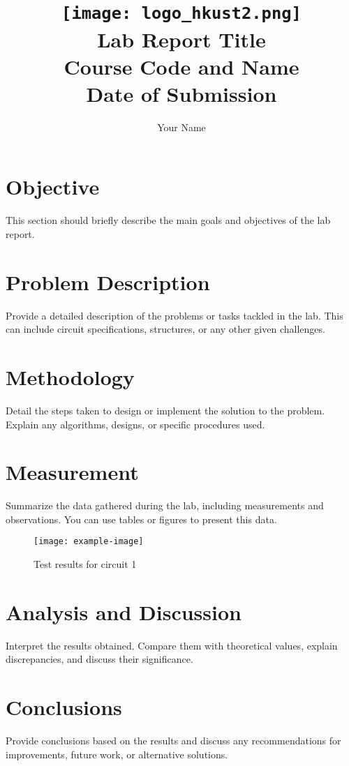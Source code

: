 \documentclass[a4paper,12pt]{article}
\title{
    \vspace{2cm} %
    \texttt{[image: logo\_hkust2.png]} \\ %
    \vspace{1cm} %
    \textbf{\Huge Lab Report Title} \\
    \vspace{1cm} %
    \large Course Code and Name \\
    \vspace{0.5cm} %
    \large Date of Submission
}
\author{Your Name}
\date{}
\begin{document}
\maketitle
\thispagestyle{empty}
\newpage

\setcounter{page}{1}  %
\tableofcontents
\newpage

\section{Objective}
This section should briefly describe the main goals and objectives of the lab report.

\section{Problem Description}
Provide a detailed description of the problems or tasks tackled in the lab. This can include circuit specifications, structures, or any other given challenges.

\section{Methodology}
Detail the steps taken to design or implement the solution to the problem. Explain any algorithms, designs, or specific procedures used.

\section{Measurement}
Summarize the data gathered during the lab, including measurements and observations. You can use tables or figures to present this data.

\begin{figure}[h!]
    \centering
    \texttt{[image: example-image]} %
    \caption{Test results for circuit 1}
    \label{fig:circuit1}
\end{figure}

\section{Analysis and Discussion}
Interpret the results obtained. Compare them with theoretical values, explain discrepancies, and discuss their significance.

\section{Conclusions}
Provide conclusions based on the results and discuss any recommendations for improvements, future work, or alternative solutions.

\newpage

\end{document}
